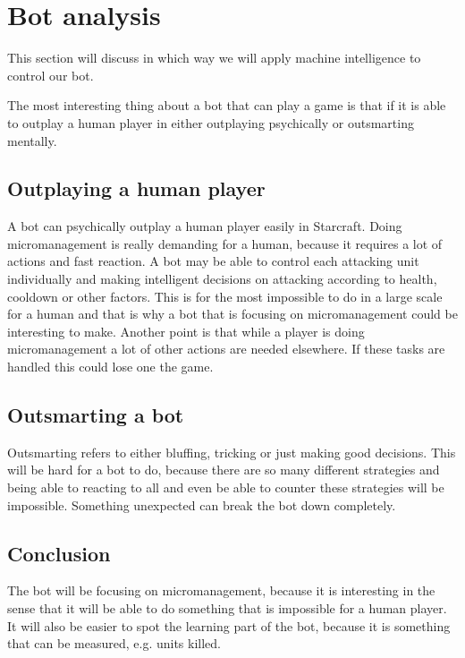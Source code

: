 \section{Bot analysis}
	This section will discuss in which way we will apply machine intelligence to control our bot.
	
	The most interesting thing about a bot that can play a game is that if it is able to outplay a 
	human player in either outplaying psychically or outsmarting mentally. 
	
	\subsection*{Outplaying a human player}
		A bot can psychically outplay a human player easily in Starcraft. 
		Doing micromanagement is really demanding for a human, because it requires a lot of actions and fast reaction. A bot may be able to control each 
		attacking unit individually and making intelligent decisions on attacking according to health, cooldown or other factors. This is for the most 
		impossible to do in a large scale for a human and that is why a bot that is focusing on micromanagement could be interesting to make. Another point 
		is that while a player is doing micromanagement a lot of other actions are needed elsewhere. If these tasks are handled this could lose one the game.
		
	\subsection*{Outsmarting a bot}
		Outsmarting refers to either bluffing, tricking or just making good decisions. This will be hard for a bot to do, because there are so many 
		different strategies and being able to reacting to all and even be able to counter these strategies will be impossible. Something unexpected 
		can break the bot down completely.
		
	\subsection*{Conclusion}
		The bot will be focusing on micromanagement, because it is interesting in the sense that it will be able to do something that is impossible for a 
		human player. It will also be easier to spot the learning part of the bot, because it is something that can be measured, e.g. units killed.
	